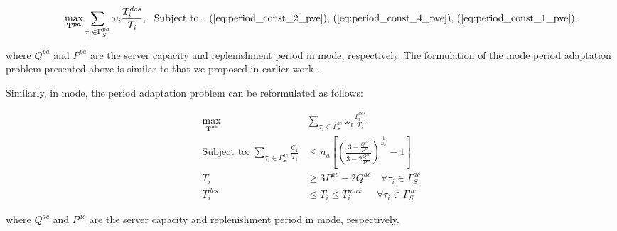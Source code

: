 \documentclass[../rt_server_main.tex]{subfiles}
\begin{document}
\begin{myoptimizationproblem} \label{opt:period_adapt_server_pve}
\vspace*{-2.0em}
\begin{subequations}
\begin{align}
\quad \quad \underset{\mathbf{T}^{\boldsymbol{pa} }}{\operatorname{max}} \sum_{\tau_i \in \Gamma_S^{pa}} \omega_i \frac{T_i^{des}}{T_i}, ~~ %
\text{Subject to:~  (\ref{eq:period_const_2_pve}), (\ref{eq:period_const_4_pve}),  (\ref{eq:period_const_1_pve})} \nonumber.
\end{align}
\end{subequations}
\end{myoptimizationproblem}
\hspace{-1.9em}
where $Q^{pa}$ and $P^{pa}$ are the server capacity and replenishment period in \pve mode, respectively. The formulation of the \pve mode period adaptation problem presented above is similar to that we proposed in earlier work \cite{mhasan_rtss16}.

Similarly, in \ave mode, the period adaptation problem can be reformulated as follows:

\begin{myoptimizationproblem} \label{opt:period_adapt_server_ave}
\vspace*{-2.0em}
\begin{subequations}
\begin{align}
\underset{\mathbf{T}^{\boldsymbol{ac}}}{\operatorname{max}} & \sum_{\tau_i \in \Gamma_S^{ac}} \omega_i \frac{T_i^{des}}{T_i} ~~ \quad  \nonumber \\
\text{Subject to:~} %
\sum_{\tau_i \in \Gamma_S^{ac}}\frac{C_i}{T_i} &\leq  n_a \left[ \left( \tfrac{3 - \tfrac{Q^{ac}}{P^{ac}}}{3 - 2 \tfrac{Q^{ac}}{P^{ac}}} \right)^{\frac{1}{n_a}} - 1 \right] \label{eq:period_const_2_ave} \\
T_i &\geq 3P^{ac} - 2Q^{ac} \quad \forall \tau_i \in \Gamma_S^{ac} \label{eq:period_const_4_ave} \\
T_i^{des} &\leq T_i \leq T_i^{max}  \quad ~~\forall \tau_i \in \Gamma_S^{ac} \label{eq:period_const_1_ave}
\end{align}
\end{subequations}
\end{myoptimizationproblem}
\hspace{-1.9em}
where $Q^{ac}$ and $P^{ac}$ are the server capacity and replenishment period in \ave mode, respectively.
\end{document}
